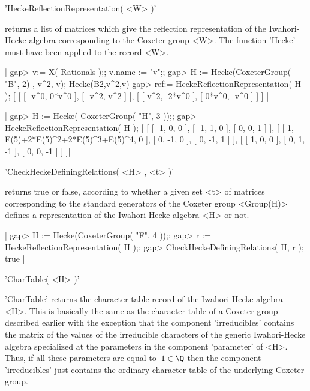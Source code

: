 
'HeckeReflectionRepresentation( <W> )'

returns a list  of matrices which give  the reflection  representation of
the Iwahori-Hecke algebra  corresponding to the  Coxeter group <W>.   The
function 'Hecke' must have been applied to the record <W>.

|    gap> v:= X( Rationals );;  v.name := "v";;
    gap> H := Hecke(CoxeterGroup( "B", 2) , v^2, v);
    Hecke(B2,v^2,v)
    gap> ref:= HeckeReflectionRepresentation( H );
    [ [ [ -v^0, 0*v^0 ], [ -v^2, v^2 ] ],
      [ [ v^2, -2*v^0 ], [ 0*v^0, -v^0 ] ] ] |

|    gap> H := Hecke( CoxeterGroup( "H", 3 ));;
    gap> HeckeReflectionRepresentation( H );
    [ [ [ -1, 0, 0 ], [ -1, 1, 0 ], [ 0, 0, 1 ] ],
      [ [ 1, E(5)+2*E(5)^2+2*E(5)^3+E(5)^4, 0 ], [ 0, -1, 0 ],
          [ 0, -1, 1 ] ], [ [ 1, 0, 0 ], [ 0, 1, -1 ], [ 0, 0, -1 ] ] ]|


'CheckHeckeDefiningRelations( <H> , <t> )'

returns true or false, according  to whether a  given set <t> of matrices
corresponding to the standard generators  of the Coxeter group <Group(H)>
defines a representation of the Iwahori-Hecke algebra <H> or not.

|    gap> H := Hecke(CoxeterGroup( "F", 4 ));;
    gap> r := HeckeReflectionRepresentation( H );;
    gap> CheckHeckeDefiningRelations( H, r );
    true |

'CharTable( <H> )'

'CharTable'  returns the  character  table record  of the  Iwahori-Hecke
algebra <H>.  This is  basically the  same as the  character table  of a
Coxeter group  described earlier with  the exception that  the component
'irreducibles'  contains the  matrix of  the values  of the  irreducible
characters  of  the generic  Iwahori-Hecke  algebra  specialized at  the
parameters  in the  component 'parameter'  of  <H>. Thus,  if all  these
parameters are  equal to~$1  \in \Q$  then the  component 'irreducibles'
just contains  the ordinary  character table  of the  underlying Coxeter
group.

